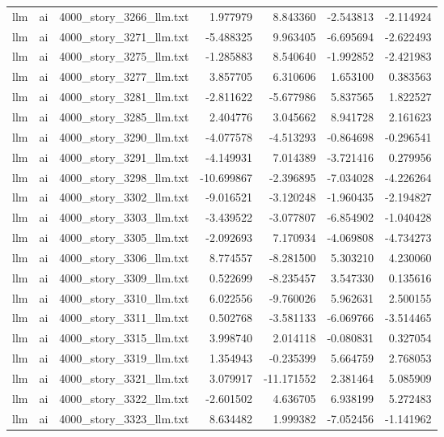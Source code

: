 \begin{longtable}{lllrrrr}
llm & ai & 4000\_story\_3266\_llm.txt & 1.977979 & 8.843360 & -2.543813 & -2.114924 \\
llm & ai & 4000\_story\_3271\_llm.txt & -5.488325 & 9.963405 & -6.695694 & -2.622493 \\
llm & ai & 4000\_story\_3275\_llm.txt & -1.285883 & 8.540640 & -1.992852 & -2.421983 \\
llm & ai & 4000\_story\_3277\_llm.txt & 3.857705 & 6.310606 & 1.653100 & 0.383563 \\
llm & ai & 4000\_story\_3281\_llm.txt & -2.811622 & -5.677986 & 5.837565 & 1.822527 \\
llm & ai & 4000\_story\_3285\_llm.txt & 2.404776 & 3.045662 & 8.941728 & 2.161623 \\
llm & ai & 4000\_story\_3290\_llm.txt & -4.077578 & -4.513293 & -0.864698 & -0.296541 \\
llm & ai & 4000\_story\_3291\_llm.txt & -4.149931 & 7.014389 & -3.721416 & 0.279956 \\
llm & ai & 4000\_story\_3298\_llm.txt & -10.699867 & -2.396895 & -7.034028 & -4.226264 \\
llm & ai & 4000\_story\_3302\_llm.txt & -9.016521 & -3.120248 & -1.960435 & -2.194827 \\
llm & ai & 4000\_story\_3303\_llm.txt & -3.439522 & -3.077807 & -6.854902 & -1.040428 \\
llm & ai & 4000\_story\_3305\_llm.txt & -2.092693 & 7.170934 & -4.069808 & -4.734273 \\
llm & ai & 4000\_story\_3306\_llm.txt & 8.774557 & -8.281500 & 5.303210 & 4.230060 \\
llm & ai & 4000\_story\_3309\_llm.txt & 0.522699 & -8.235457 & 3.547330 & 0.135616 \\
llm & ai & 4000\_story\_3310\_llm.txt & 6.022556 & -9.760026 & 5.962631 & 2.500155 \\
llm & ai & 4000\_story\_3311\_llm.txt & 0.502768 & -3.581133 & -6.069766 & -3.514465 \\
llm & ai & 4000\_story\_3315\_llm.txt & 3.998740 & 2.014118 & -0.080831 & 0.327054 \\
llm & ai & 4000\_story\_3319\_llm.txt & 1.354943 & -0.235399 & 5.664759 & 2.768053 \\
llm & ai & 4000\_story\_3321\_llm.txt & 3.079917 & -11.171552 & 2.381464 & 5.085909 \\
llm & ai & 4000\_story\_3322\_llm.txt & -2.601502 & 4.636705 & 6.938199 & 5.272483 \\
llm & ai & 4000\_story\_3323\_llm.txt & 8.634482 & 1.999382 & -7.052456 & -1.141962 \\

\end{longtable}
